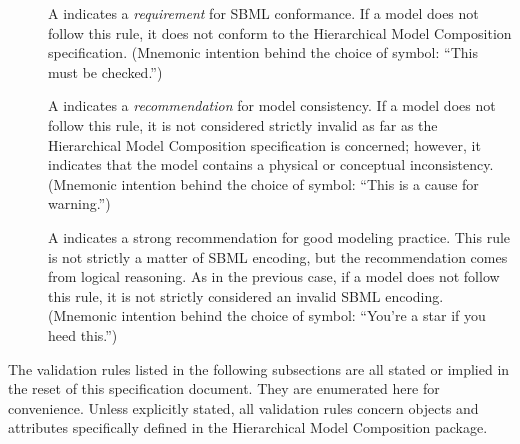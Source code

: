 \begin{description}

\item[\hspace*{6.5pt}\vSymbol\vsp] A \vSymbolName indicates a
  \emph{requirement} for SBML conformance. If a model does not follow
  this rule, it does not conform to the Hierarchical Model Composition
  specification.  (Mnemonic intention behind the choice of symbol:
  ``This must be checked.'')

\item[\hspace*{6.5pt}\cSymbol\csp] A \cSymbolName indicates a
  \emph{recommendation} for model consistency.  If a model does not
  follow this rule, it is not considered strictly invalid as far as
  the Hierarchical Model Composition specification is concerned;
  however, it indicates that the model contains a physical or
  conceptual inconsistency.  (Mnemonic intention behind the choice of
  symbol: ``This is a cause for warning.'')

\item[\hspace*{6.5pt}\mSymbol\msp] A \mSymbolName indicates a strong
  recommendation for good modeling practice.  This rule is not
  strictly a matter of SBML encoding, but the recommendation comes
  from logical reasoning.  As in the previous case, if a model does
  not follow this rule, it is not strictly considered an invalid SBML
  encoding.  (Mnemonic intention behind the choice of symbol: ``You're
  a star if you heed this.'')

\end{description}

The validation rules listed in the following subsections are all stated
or implied in the reset of this specification document.  They are
enumerated here for convenience.  Unless explicitly stated, all
validation rules concern objects and attributes specifically defined in
the Hierarchical Model Composition package.


